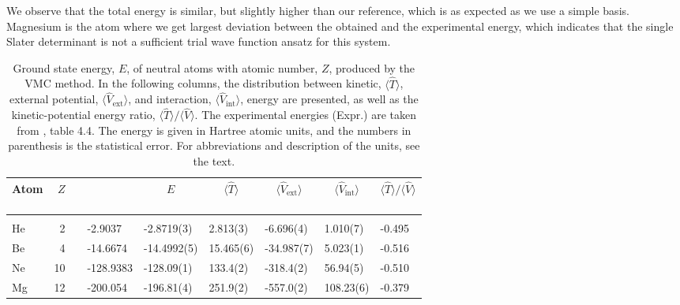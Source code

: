 We observe that the total energy is similar, but slightly higher than our reference, which is as expected as we use a simple basis. Magnesium is the atom where we get largest deviation between the obtained and the experimental energy, which indicates that the single Slater determinant is not a sufficient trial wave function ansatz for this system.

\begin{table}[H]
	\caption{Ground state energy, $E$, of neutral atoms with atomic number, $Z$, produced by the VMC method. In the following columns, the distribution between kinetic, $\langle\hat{T}\rangle$, external potential, $\langle\hat{V}_{\text{ext}}\rangle$, and interaction, $\langle\hat{V}_{\text{int}}\rangle$, energy are presented, as well as the kinetic-potential energy ratio, $\langle\hat{T}\rangle/\langle\hat{V}\rangle$. The experimental energies (Expr.) are taken from \citet{degroote_faddeev_2013}, table 4.4. The energy is given in Hartree atomic units, and the numbers in parenthesis is the statistical error. For abbreviations and description of the units, see the text.}
	\label{tab:atomswinteraction}
	\begin{tabularx}{\textwidth}{lrrR{2cm}R{1.9cm}|R{1.7cm}R{1.7cm}R{1.7cm}R{1.7cm}} \hline\hline
		Atom & $Z$ & \makecell{\\ \phantom{=} \\ \phantom{=}} & 
		 &  &  &  &  &  \\ \hline \\
		
		He & 2 && -2.9037 & -2.8719(3) & 2.813(3) & -6.696(4) & 1.010(7) & -0.495 \\
		Be & 4 && -14.6674 & -14.4992(5) & 15.465(6) & -34.987(7) & 5.023(1) & -0.516 \\
		Ne & 10 && -128.9383 & -128.09(1) & 133.4(2) & -318.4(2) & 56.94(5) & -0.510 \\ 
		Mg & 12 && -200.054 & -196.81(4) & 251.9(2) & -557.0(2) & 108.23(6) & -0.379 \\ \hline\hline
	\end{tabularx}
\end{table}

